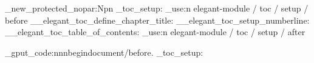 \RenewDocumentCommand \cleardoublepage { }
  {
    \clearpage
    \if@twoside
      \ifodd \c@page
      \else
        \hbox{}
        \thispagestyle{empty}
        \newpage
        \if@twocolumn
          \hbox{}
          \newpage
        \fi
      \fi
    \fi
  }


\cs_new_protected_nopar:Npn \elegant_toc_setup:
  {
    \hook_use:n { elegant-module / toc / setup / before }
    \__elegant_toc_define_chapter_title:
    \__elegant_toc_setup_numberline:
    \RenewDocumentCommand \tableofcontents { }
      { \__elegant_toc_table_of_contents: }
    \hook_use:n { elegant-module / toc / setup / after }
  }


\hook_gput_code:nnn{begindocument/before}{.}
  { \elegant_toc_setup: }


\endinput
